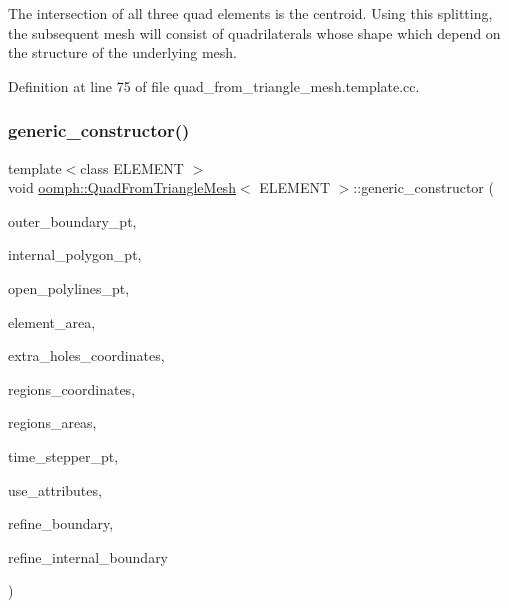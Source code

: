 The intersection of all three quad elements is the centroid. Using this splitting, the subsequent mesh will consist of quadrilaterals whose shape which depend on the structure of the underlying mesh. 

Definition at line 75 of file quad\+\_\+from\+\_\+triangle\+\_\+mesh.\+template.\+cc.

\mbox{\label{classoomph_1_1QuadFromTriangleMesh_ae2036525cc3a3b2bdd8edfa01783a303}} 
\subsubsection{\texorpdfstring{generic\+\_\+constructor()}{generic\_constructor()}}
{\footnotesize\ttfamily template$<$class E\+L\+E\+M\+E\+NT $>$ \\
void \hyperlink{classoomph_1_1QuadFromTriangleMesh}{oomph\+::\+Quad\+From\+Triangle\+Mesh}$<$ E\+L\+E\+M\+E\+NT $>$\+::generic\+\_\+constructor (\begin{DoxyParamCaption}\item[{Vector$<$ Triangle\+Mesh\+Polygon $\ast$$>$ \&}]{outer\+\_\+boundary\+\_\+pt,  }\item[{Vector$<$ Triangle\+Mesh\+Polygon $\ast$$>$ \&}]{internal\+\_\+polygon\+\_\+pt,  }\item[{Vector$<$ Triangle\+Mesh\+Open\+Curve $\ast$$>$ \&}]{open\+\_\+polylines\+\_\+pt,  }\item[{const double \&}]{element\+\_\+area,  }\item[{Vector$<$ Vector$<$ double $>$ $>$ \&}]{extra\+\_\+holes\+\_\+coordinates,  }\item[{std\+::map$<$ unsigned, Vector$<$ double $>$ $>$ \&}]{regions\+\_\+coordinates,  }\item[{std\+::map$<$ unsigned, double $>$ \&}]{regions\+\_\+areas,  }\item[{Time\+Stepper $\ast$}]{time\+\_\+stepper\+\_\+pt,  }\item[{const bool \&}]{use\+\_\+attributes,  }\item[{const bool \&}]{refine\+\_\+boundary,  }\item[{const bool \&}]{refine\+\_\+internal\+\_\+boundary }\end{DoxyParamCaption})\hspace{0.3cm}{\ttfamily [inline]}}




